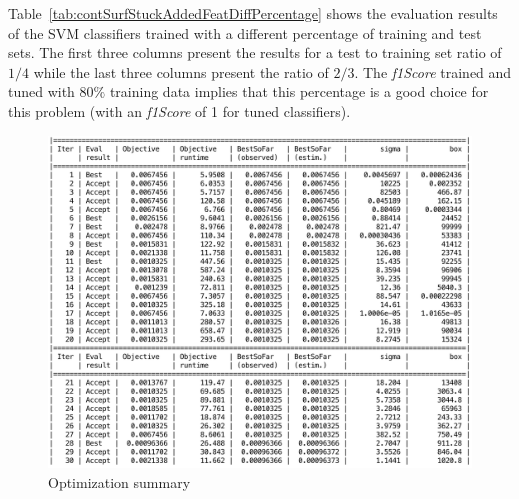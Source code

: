 Table~\ref{tab:contSurfStuckAddedFeatDiffPercentage} shows the evaluation results of the SVM classifiers trained with a different percentage of training and test sets. 
The first three columns present the results for a test to training set ratio of $1/4$ while the last three columns present the ratio of $2/3$. The \emph{f1Score} trained and tuned with $80\%$ training data implies that this percentage is a good choice for this problem (with an \emph{f1Score} of 1 for tuned classifiers). 

\iffalse

\begin{figure}
\begin{center}
\includegraphics[width=15cm]{figures/optimizationSummaryStuckFault}    %
\caption{Optimization summary} 
\label{fig:optimizationSummaryStuckFault}
\end{center}
\end{figure}

